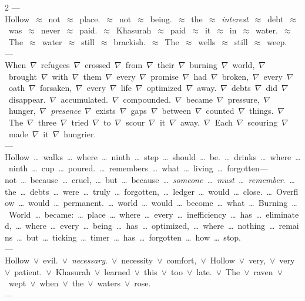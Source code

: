 \documentclass[11pt,letterpaper,twoside]{book}
\begin{document}
\begin{multicols}{2}
---\\
Hollow~$\approx$~not~$\approx$~place.~$\approx$~not~$\approx$~being.~$\approx$~the~$\approx$~\textit{interest}~$\approx$~debt~$\approx$~was~$\approx$~never~$\approx$~paid.~$\approx$~Khasurah~$\approx$~paid~$\approx$~it~$\approx$~in~$\approx$~water.~$\approx$~The~$\approx$~water~$\approx$~still~$\approx$~brackish.~$\approx$~The~$\approx$~wells~$\approx$~still~$\approx$~weep.\\[0.5ex]
---\\
When~$\nabla$~refugees~$\nabla$~crossed~$\nabla$~from~$\nabla$~their~$\nabla$~burning~$\nabla$~world,~$\nabla$~brought~$\nabla$~with~$\nabla$~them~$\nabla$~every~$\nabla$~promise~$\nabla$~had~$\nabla$~broken,~$\nabla$~every~$\nabla$~oath~$\nabla$~forsaken,~$\nabla$~every~$\nabla$~life~$\nabla$~optimized~$\nabla$~away.~$\nabla$~debts~$\nabla$~did~$\nabla$~disappear.~$\nabla$~accumulated.~$\nabla$~compounded.~$\nabla$~became~$\nabla$~pressure,~$\nabla$~hunger,~$\nabla$~\textit{presence}~$\nabla$~exists~$\nabla$~gaps~$\nabla$~between~$\nabla$~counted~$\nabla$~things.~$\nabla$~The~$\nabla$~three~$\nabla$~tried~$\nabla$~to~$\nabla$~scour~$\nabla$~it~$\nabla$~away.~$\nabla$~Each~$\nabla$~scouring~$\nabla$~made~$\nabla$~it~$\nabla$~hungrier.\\[0.5ex]
---\\
Hollow~\dots~walks~\dots~where~\dots~ninth~\dots~step~\dots~should~\dots~be.~\dots~drinks~\dots~where~\dots~ninth~\dots~cup~\dots~poured.~\dots~remembers~\dots~what~\dots~living~\dots~forgotten---not~\dots~because~\dots~cruel,~\dots~but~\dots~because~\dots~\textit{someone~\dots~must~\dots~remember}.~\dots~the~\dots~debts~\dots~were~\dots~truly~\dots~forgotten,~\dots~ledger~\dots~would~\dots~close.~\dots~Overflow~\dots~would~\dots~permanent.~\dots~world~\dots~would~\dots~become~\dots~what~\dots~Burning~\dots~World~\dots~became:~\dots~place~\dots~where~\dots~every~\dots~inefficiency~\dots~has~\dots~eliminated,~\dots~where~\dots~every~\dots~being~\dots~has~\dots~optimized,~\dots~where~\dots~nothing~\dots~remains~\dots~but~\dots~ticking~\dots~timer~\dots~has~\dots~forgotten~\dots~how~\dots~stop.\\[0.5ex]
---\\
Hollow~$\vee$~evil.~$\vee$~\textit{necessary}.~$\vee$~necessity~$\vee$~comfort,~$\vee$~Hollow~$\vee$~very,~$\vee$~very~$\vee$~patient.~$\vee$~Khasurah~$\vee$~learned~$\vee$~this~$\vee$~too~$\vee$~late.~$\vee$~The~$\vee$~raven~$\vee$~wept~$\vee$~when~$\vee$~the~$\vee$~waters~$\vee$~rose.\\[0.5ex]
---\\

\end{multicols}
\end{document}
